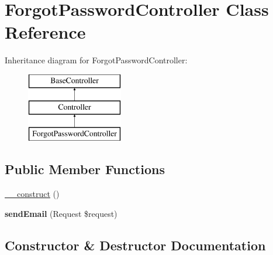 \hypertarget{class_app_1_1_http_1_1_controllers_1_1_auth_1_1_forgot_password_controller}{}\section{Forgot\+Password\+Controller Class Reference}
\label{class_app_1_1_http_1_1_controllers_1_1_auth_1_1_forgot_password_controller}
Inheritance diagram for Forgot\+Password\+Controller\+:\begin{figure}[H]
\begin{center}
\leavevmode
\includegraphics[height=3.000000cm]{class_app_1_1_http_1_1_controllers_1_1_auth_1_1_forgot_password_controller}
\end{center}
\end{figure}
\subsection*{Public Member Functions}
\begin{DoxyCompactItemize}
\item 
\mbox{\hyperlink{class_app_1_1_http_1_1_controllers_1_1_auth_1_1_forgot_password_controller_a095c5d389db211932136b53f25f39685}{\+\_\+\+\_\+construct}} ()
\item 
\mbox{\label{class_app_1_1_http_1_1_controllers_1_1_auth_1_1_forgot_password_controller_af4cfcc1e365905cf907f08b35b0c3d8c}} 
{\bfseries send\+Email} (Request \$request)
\end{DoxyCompactItemize}


\subsection{Constructor \& Destructor Documentation}
\mbox{\label{class_app_1_1_http_1_1_controllers_1_1_auth_1_1_forgot_password_controller_a095c5d389db211932136b53f25f39685}} 
